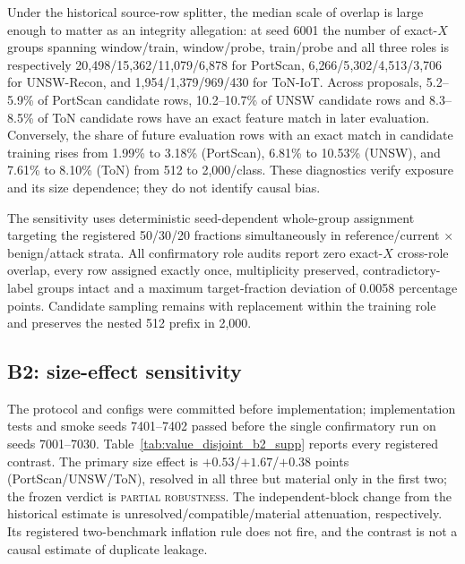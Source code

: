 \documentclass[a4paper,11pt]{article}
\makeatletter
\let\supp@subsection\subsection
\renewcommand{\subsection}{\FloatBarrier\supp@subsection}
\makeatother
\begin{document}


Under the historical source-row splitter, the median scale of overlap is large enough to
matter as an integrity allegation: at seed 6001 the number of exact-$X$ groups spanning
window/train, window/probe, train/probe and all three roles is respectively
20{,}498/15{,}362/11{,}079/6{,}878 for PortScan,
6{,}266/5{,}302/4{,}513/3{,}706 for UNSW-Recon, and
1{,}954/1{,}379/969/430 for ToN-IoT. Across proposals, 5.2--5.9\% of PortScan candidate rows,
10.2--10.7\% of UNSW candidate rows and 8.3--8.5\% of ToN candidate rows have an exact
feature match in later evaluation. Conversely, the share of future evaluation rows with
an exact match in candidate training rises from 1.99\% to 3.18\% (PortScan), 6.81\% to
10.53\% (UNSW), and 7.61\% to 8.10\% (ToN) from 512 to 2{,}000/class. These diagnostics
verify exposure and its size dependence; they do not identify causal bias.

The sensitivity uses deterministic seed-dependent whole-group assignment targeting the
registered 50/30/20 fractions simultaneously in reference/current $\times$ benign/attack
strata. All confirmatory role audits report zero exact-$X$ cross-role overlap, every row
assigned exactly once, multiplicity preserved, contradictory-label groups intact and a
maximum target-fraction deviation of 0.0058 percentage points. Candidate sampling remains
with replacement within the training role and preserves the nested 512 prefix in 2{,}000.

\subsection{B2: size-effect sensitivity}

The protocol and configs were committed before implementation; implementation tests and
smoke seeds 7401--7402 passed before the single confirmatory run on seeds 7001--7030.
Table~\ref{tab:value_disjoint_b2_supp} reports every registered contrast. The primary size
effect is $+0.53$/$+1.67$/$+0.38$ points (PortScan/UNSW/ToN), resolved in all three but
material only in the first two; the frozen verdict is \textsc{partial robustness}. The
independent-block change from the historical estimate is unresolved/compatible/material
attenuation, respectively. Its registered two-benchmark inflation rule does not fire, and
the contrast is not a causal estimate of duplicate leakage.


\end{document}
